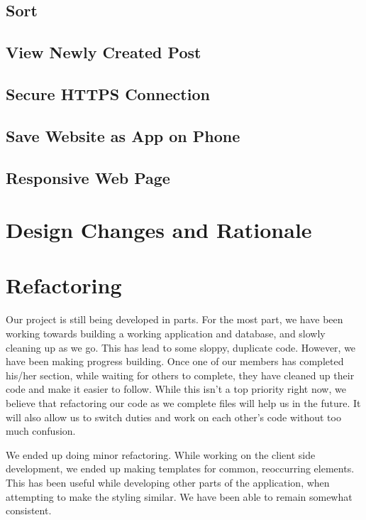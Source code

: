 \documentclass[12pt]{article}
\begin{document}
      \subsection{Sort}
      
      \subsection{View Newly Created Post}
     
      \subsection{Secure HTTPS Connection}
      
      \subsection{Save Website as App on Phone}
      
      \subsection{Responsive Web Page}

\section{Design Changes and Rationale}

\section{Refactoring}

    Our project is still being developed in parts. For the most part, we have been working towards building a working application and database, and slowly cleaning up as we go. This has lead to some sloppy, duplicate code. However, we have been making progress building. Once one of our members has completed his/her section, while waiting for others to complete, they have cleaned up their code and make it easier to follow. While this isn’t a top priority right now, we believe that refactoring our code as we complete files will help us in the future. It will also allow us to switch duties and work on each other's code without too much confusion. 

    We ended up doing minor refactoring. While working on the client side development, we ended up making templates for common, reoccurring elements. This has been useful while developing other parts of the application, when attempting to make the styling similar. We have been able to remain somewhat consistent. 
\end{document}
